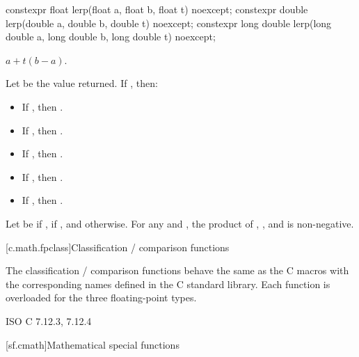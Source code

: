 %
\begin{itemdecl}
constexpr float lerp(float a, float b, float t) noexcept;
constexpr double lerp(double a, double b, double t) noexcept;
constexpr long double lerp(long double a, long double b, long double t) noexcept;
\end{itemdecl}
\begin{itemdescr}
\pnum
\returns
$a+t(b-a)$.

\pnum
\remarks
Let  be the value returned.
If , then:
\begin{itemize}
\item If , then .
\item If , then .
\item If , then .
\item If , then .
\item If , then .
\end{itemize}
Let  be  if ,
 if , and  otherwise.
For any  and , the product of
,
, and
is non-negative.
\end{itemdescr}

[c.math.fpclass]{Classification / comparison functions}

\pnum
The classification / comparison functions behave the same as the C macros with the
corresponding names defined in the C standard library.
Each function is overloaded for the three floating-point types.

\xref
ISO C 7.12.3, 7.12.4

[sf.cmath]{Mathematical special functions}%
%

